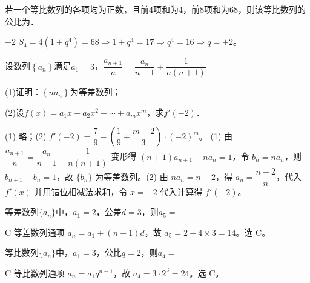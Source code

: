 


\begin{question}
若一个等比数列的各项均为正数，且前4项和为4，前8项和为68，则该等比数列的公比为\blank{3cm}．
\end{question}
\begin{answer}{$\pm2$}
$S_4=4(1+q^4)=68\Rightarrow1+q^4=17\Rightarrow q^4=16\Rightarrow q=\pm2$。
\end{answer}

\begin{question}
设数列$\left\{ a_n \right\}$满足$a_1=3$，$\dfrac{a_{n+1}}{n}=\dfrac{a_n}{n+1}+\dfrac{1}{n(n+1)}$

(1)证明：$\left\{ na_n \right\}$为等差数列；

(2)设$f(x)=a_1x+a_2x^2+\cdots +a_mx^m$，求$f'(-2)$．
\end{question}
\begin{answer}{(1) 略；(2) $f'(-2)=\dfrac{7}{9}-\left(\dfrac{1}{9}+\dfrac{m+2}{3}\right)\cdot(-2)^m$。}
(1) 由 $\dfrac{a_{n+1}}{n}=\dfrac{a_n}{n+1}+\dfrac{1}{n(n+1)}$ 变形得 $(n+1)a_{n+1}-na_n=1$，令 $b_n=na_n$，则 $b_{n+1}-b_n=1$，故 $\{b_n\}$ 为等差数列。(2) 由 $na_n=n+2$，得 $a_n=\dfrac{n+2}{n}$，代入 $f'(x)$ 并用错位相减法求和，令 $x=-2$ 代入计算得 $f'(-2)$。
\end{answer}

\begin{question}[GPT生成]
等差数列$\{a_n\}$中，$a_1=2$，公差$d=3$，则$a_5=$\choiceBox
{}
\end{question}
\begin{answer}{C}
等差数列通项 $a_n=a_1+(n-1)d$，故 $a_5=2+4\times3=14$。选 C。
\end{answer}



\begin{question}[GPT生成]
等比数列$\{a_n\}$中，$a_1=3$，公比$q=2$，则$a_4=$\choiceBox
{}
\end{question}
\begin{answer}{C}
等比数列通项 $a_n=a_1q^{n-1}$，故 $a_4=3\cdot2^3=24$。选 C。
\end{answer}

